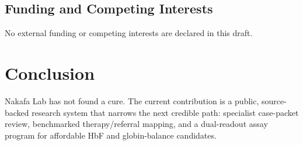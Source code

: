 \subsection{Funding and Competing Interests}

No external funding or competing interests are declared in this draft.

\section{Conclusion}

Nakafa Lab has not found a cure. The current contribution is a public,
source-backed research system that narrows the next credible path: specialist
case-packet review, benchmarked therapy/referral mapping, and a dual-readout
assay program for affordable HbF and globin-balance candidates.
